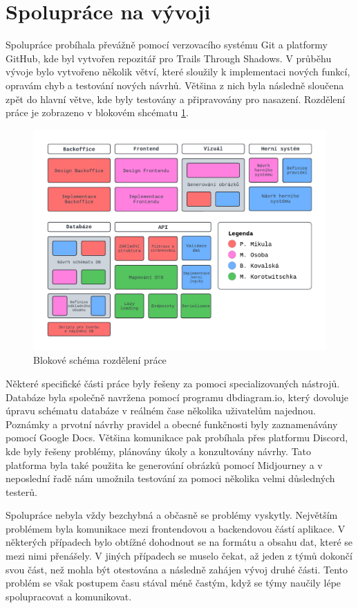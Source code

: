 \section{Spolupráce na vývoji}
Spolupráce probíhala převážně pomocí verzovacího systému Git a platformy GitHub, kde byl vytvořen repozitář pro Trails Through Shadows. V průběhu vývoje bylo vytvořeno několik větví, které sloužily k implementaci nových funkcí, opravám chyb a testování nových návrhů. Většina z nich byla následně sloučena zpět do hlavní větve, kde byly testovány a připravovány pro nasazení. Rozdělení práce je zobrazeno v blokovém shcématu \ref{fig:workflow}.

\begin{figure}[H]
  \centering
  \includegraphics[width=.95\textwidth]{../../shared/diagrams/blocks.pdf}
  \caption{Blokové schéma rozdělení práce}
  \label{fig:workflow}
\end{figure}

Některé specifické části práce byly řešeny za pomoci specializovaných nástrojů. Databáze byla společně navržena pomocí programu dbdiagram.io, který dovoluje úpravu schématu databáze v reálném čase několika uživatelům najednou. Poznámky a prvotní návrhy pravidel a obecné funkčnosti byly zaznamenávány pomocí Google Docs. Většina komunikace pak probíhala přes platformu Discord, kde byly řešeny problémy, plánovány úkoly a konzultovány návrhy. Tato platforma byla také použita ke generování obrázků pomocí Midjourney a v neposlední řadě nám umožnila testování za pomoci několika velmi důsledných testerů.

Spolupráce nebyla vždy bezchybná a občasně se problémy vyskytly. Největším problémem byla komunikace mezi frontendovou a backendovou částí aplikace. V některých případech bylo obtížné dohodnout se na formátu a obsahu dat, které se mezi nimi přenášely. V jiných případech se muselo čekat, až jeden z týmů dokončí svou část, než mohla být otestována a následně zahájen vývoj druhé části. Tento problém se však postupem času stával méně častým, když se týmy naučily lépe spolupracovat a komunikovat.